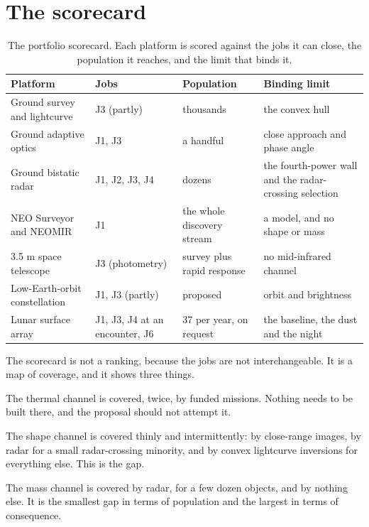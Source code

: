 \section{The scorecard}

\begin{table}[!htbp]
\centering
\small
\caption{The portfolio scorecard. Each platform is scored against the jobs
it can close, the population it reaches, and the limit that binds it.}
\label{tab:scorecard}
\begin{tabularx}{\textwidth}{@{}P{1.11in}P{0.72in}P{0.88in}Y@{}}
\toprule
{}
\textbf{Platform} & \textbf{Jobs} & \textbf{Population} & \textbf{Binding
limit} \\
\midrule
Ground survey and lightcurve & J3 (partly) & thousands & the convex hull \\
Ground adaptive optics & J1, J3 & a handful & close approach and phase
angle \\
Ground bistatic radar & J1, J2, J3, J4 & dozens & the fourth-power wall
and the radar-crossing selection \\
NEO Surveyor and NEOMIR & J1 & the whole discovery stream & a model, and no
shape or mass \\
3.5 m space telescope & J3 (photometry) & survey plus rapid response & no
mid-infrared channel \\
Low-Earth-orbit constellation & J1, J3 (partly) & proposed & orbit and
brightness \\
Lunar surface array & J1, J3, J4 at an encounter, J6 & 37 per year, on
request & the baseline, the dust and the night \\
\bottomrule
\end{tabularx}
\end{table}

The scorecard is not a ranking, because the jobs are not interchangeable.
It is a map of coverage, and it shows three things.

The thermal channel is covered, twice, by funded missions. Nothing needs to
be built there, and the proposal should not attempt it.

The shape channel is covered thinly and intermittently: by close-range
images, by radar for a small radar-crossing minority, and by convex
lightcurve inversions for everything else. This is the gap.

The mass channel is covered by radar, for a few dozen objects, and by
nothing else. It is the smallest gap in terms of population and the largest
in terms of consequence.

